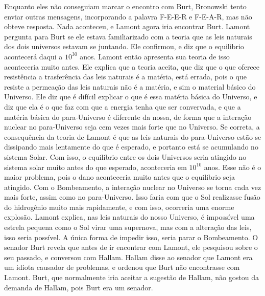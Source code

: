 \documentclass[14pt,portuguese]{extreport}
\begin{document}
	  Enquanto eles não conseguiam marcar o encontro com Burt, Bronowski tento enviar outras 
	  mensagens, incorporando a palavra F-E-E-R e F-E-A-R, mas não obteve resposta. Nada 
	  aconteceu, e Lamont agora iria encontrar Burt. Lamont pergunta para Burt se ele estava 
	  familiarizado com a teoria que as leis naturais dos dois universos estavam se juntando. 
	  Ele confirmou, e diz que o equilibrio acontecerá daqui a \(10^{30}\) anos. Lamont então apresenta 
	  sua teoria de isso aconteceria muito antes. Ele explica que a teoria aceita, que diz que 
	  o que oferece resistência a trasferência das leis naturais é a matéria, está errada, 
	  pois o que resiste a permeação das leis naturais não é a matéria, e sim o material básico 
	  do Universo. Ele diz que é difícil explicar o que é essa matéria básica do Universo, e 
	  diz que ela é o que faz com que a energia tenha que ser convervada, e que a matéria básica 
	  do para-Universo é diferente da nossa, de forma que a interação nuclear no para-Universo 
	  seja cem vezes mais forte que no Universo. Se correta, a consequência da teoria de Lamont 
	  é que as leis naturais do para-Universo estão se dissipando mais lentamente do que é 
	  esperado, e portanto está se acumulando no sistema Solar. Com isso, o equilibrio entre 
	  os dois Universos seria atingido no sistema solar muito antes do que esperado, aconteceria 
	  em \(10^{10}\) anos. Esse não é o maior problema, pois o dano aconteceria muito antes que o 
	  equilibrio seja atingido. Com o Bombeamento, a interação nuclear no Universo se torna cada 
	  vez mais forte, assim como no para-Universo. Isso faria com que o Sol realizasse fusão 
	  do hidrogênio muito mais rapidamente, e com isso, ocorreria uma enorme explosão. Lamont 
	  explica, nas leis naturais do nosso Universo, é impossível uma estrela pequena como o Sol 
	  virar uma supernova, mas com a alteração das leis, isso seria possível. A única forma de 
	  impedir isso, seria parar o Bombeamento. O senador Burt revela que antes de ir encontrar 
	  com Lamont, ele pesquisou sobre o seu passado, e conversou com Hallam. Hallam disse ao 
	  senador que Lamont era um idiota causador de problemas, e ordenou que Burt não encontrasse 
	  com Lamont. Burt, que normalmente iria aceitar a sugestão de Hallam, não gostou da demanda 
	  de Hallam, pois Burt era um senador.
	
\end{document}
